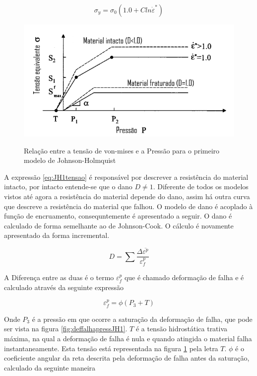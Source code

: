 \begin{equation} \label{eq:JH1tensao}
    \sigma_y = \sigma_0(1.0 + C ln\dot{\varepsilon}^*)  
\end{equation}

\begin{figure}[H] 
    \centering
    \caption{Relação entre a tensão de von-mises e a Pressão para o primeiro modelo de Johnson-Holmquist}
    \includegraphics[width = 0.7\linewidth]{images/sigmapressao.png} 
    \label{fig:JH1Tensao}
\end{figure}


A expressão \ref{eq:JH1tensao} é responsável por descrever a resistência do material intacto, por intacto entende-se que o dano $ D \neq 1 $. Diferente de todos os modelos vistos até agora a resistência do material depende do dano, assim há outra curva que descreve a resistência do material que falhou. O modelo de dano é acoplado à função de encruamento, consequntemente é apresentado a seguir. 
O dano é calculado de forma semelhante ao de Johnson-Cook. O cálculo é novamente apresentado da forma incremental. 

\begin{equation} \label{eq:danoJH}
    D = \sum \frac{\Delta \overline{\varepsilon^p} }{\varepsilon^p_f}
\end{equation}

A Diferença entre as duas é o termo $ \varepsilon^p_f $ que é chamado deformação de falha e é calculado através da seguinte expressão

\begin{equation}
    \varepsilon^p_f = \phi(P_3 + T)
\end{equation}

Onde $ P_3 $ é a pressão em que ocorre a saturação da deformação de falha, que pode ser vista na figura \ref{fig:deffalhapressJH1}. $ T $ é a tensão hidrostática trativa máxima, na qual a deformação de falha é nula e quando atingida o material falha instantaneamente. Esta tensão está representada na figura \ref{fig:JH1Tensao} pela letra $T$. $ \phi $ é o coeficiente angular da reta descrita pela deformação de falha antes da saturação, calculado da seguinte maneira

